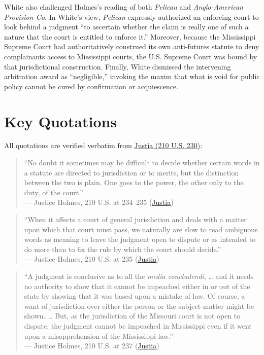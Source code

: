\documentclass[12pt]{article}
\begin{document}
White also challenged Holmes's reading of both \textit{Pelican} and \textit{Anglo-American Provision Co.} In White's view, \textit{Pelican} expressly authorized an enforcing court to look behind a judgment ``to ascertain whether the claim is really one of such a nature that the court is entitled to enforce it.'' Moreover, because the Mississippi Supreme Court had authoritatively construed its own anti-futures statute to deny complainants access to Mississippi courts, the U.S. Supreme Court was bound by that jurisdictional construction. Finally, White dismissed the intervening arbitration award as ``negligible,'' invoking the maxim that what is void for public policy cannot be cured by confirmation or acquiescence.

\section{Key Quotations}

All quotations are verified verbatim from \href{https://supreme.justia.com/cases/federal/us/210/230/}{Justia (210 U.S. 230)}:

\begin{quote}
``No doubt it sometimes may be difficult to decide whether certain words in a statute are directed to jurisdiction or to merits, but the distinction between the two is plain. One goes to the power, the other only to the duty, of the court.'' \\
--- Justice Holmes, 210 U.S. at 234--235 (\href{https://supreme.justia.com/cases/federal/us/210/230/}{Justia})
\end{quote}

\begin{quote}
``When it affects a court of general jurisdiction and deals with a matter upon which that court must pass, we naturally are slow to read ambiguous words as meaning to leave the judgment open to dispute or as intended to do more than to fix the rule by which the court should decide.'' \\
--- Justice Holmes, 210 U.S. at 235 (\href{https://supreme.justia.com/cases/federal/us/210/230/}{Justia})
\end{quote}

\begin{quote}
``A judgment is conclusive as to all the \textit{media concludendi}, \ldots{} and it needs no authority to show that it cannot be impeached either in or out of the state by showing that it was based upon a mistake of law. Of course, a want of jurisdiction over either the person or the subject matter might be shown. \ldots{} But, as the jurisdiction of the Missouri court is not open to dispute, the judgment cannot be impeached in Mississippi even if it went upon a misapprehension of the Mississippi law.'' \\
--- Justice Holmes, 210 U.S. at 237 (\href{https://supreme.justia.com/cases/federal/us/210/230/}{Justia})
\end{quote}
\end{document}

